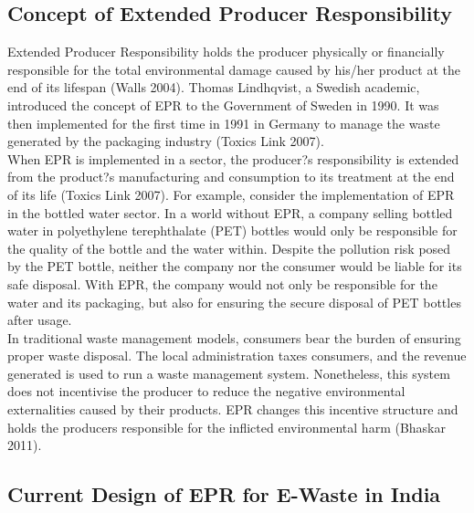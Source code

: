 \documentclass[a4paper, 12pt]{article}
\begin{document}
                    \subsection{Concept of Extended Producer Responsibility}
                    
                    Extended Producer Responsibility holds the producer physically or financially responsible for the total environmental damage caused by his/her product at the end of its lifespan (Walls 2004). Thomas Lindhqvist, a Swedish academic, introduced the concept of EPR to the Government of Sweden in 1990. It was then implemented for the first time in 1991 in Germany to manage the waste generated by the packaging industry (Toxics Link 2007).\\
                    
                    When EPR is implemented in a sector, the producer?s responsibility is extended from the product?s manufacturing and consumption to its treatment at the end of its life (Toxics Link 2007). For example, consider the implementation of EPR in the bottled water sector. In a world without EPR, a company selling bottled water in polyethylene terephthalate (PET) bottles would only be responsible for the quality of the bottle and the water within. Despite the pollution risk posed by the PET bottle, neither the  company nor the consumer would be liable for its safe disposal. With EPR, the company would not only be responsible for the water and its packaging, but also for ensuring the secure disposal of PET bottles after usage. \\
                    
                    In traditional waste management models, consumers bear the burden of ensuring proper waste disposal. The local administration taxes consumers, and the revenue generated is used to run a waste management system. Nonetheless, this system does not incentivise the producer to reduce the negative environmental externalities caused by their products. EPR changes this incentive structure and holds the producers responsible for the inflicted environmental harm (Bhaskar 2011). \\
                    
                    \subsection{Current Design of EPR for E-Waste in India}
                    
\end{document}
